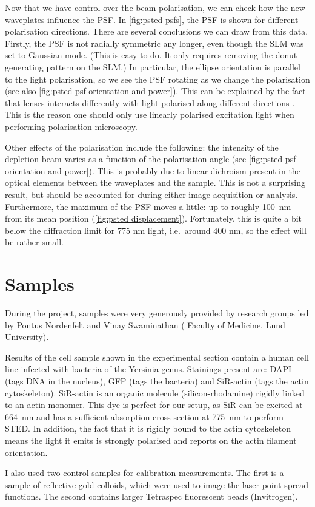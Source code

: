 Now that we have control over the beam polarisation, we can check how the new waveplates influence the PSF. In \autoref{fig:psted psfs}, the PSF is shown for different polarisation directions. There are several conclusions we can draw from this data.  Firstly, the PSF is not radially symmetric any longer, even though the SLM was set to Gaussian mode. (This is easy to do. It only requires removing the donut-generating pattern on the SLM.) In particular, the ellipse orientation is parallel to the light polarisation, so we see the PSF rotating as we change the polarisation (see also \autoref{fig:psted psf orientation and power}). This can be explained by the fact that lenses interacts differently with light polarised along different directions \cite{Egner2020}. This is the reason one should only use linearly polarised excitation light when performing polarisation microscopy.

Other effects of the polarisation include the following: the intensity of the depletion beam varies as a function of the polarisation angle (see \autoref{fig:psted psf orientation and power}). This is probably due to linear dichroism present in the optical elements between the waveplates and the sample. This is not a surprising result, but should be accounted for during either image acquisition or analysis. Furthermore, the maximum of the PSF moves a little: up to roughly 100~nm from its mean position (\autoref{fig:psted displacement}). Fortunately, this is quite a bit below the diffraction limit for 775 nm light, i.e.~around 400 nm, so the effect will be rather small.

\section{Samples}
\label{sec:samples}

During the project, samples were very generously provided by research groups led by Pontus Nordenfelt and Vinay Swaminathan (%
Faculty of Medicine, Lund University).

Results of the cell sample shown in the experimental section contain a human cell line infected with bacteria of the Yersinia genus. Stainings present are: DAPI (tags DNA in the nucleus), GFP (tags the bacteria) and SiR-actin (tags the actin cytoskeleton). SiR-actin is an organic molecule (silicon-rhodamine) rigidly linked to an actin monomer. This dye is perfect for our setup, as SiR can be excited at 664~nm and has a sufficient absorption cross-section at 775~nm to perform STED. In addition, the fact that it is rigidly bound to the actin cytoskeleton means the light it emits is strongly polarised and reports on the actin filament orientation.

I also used two control samples for calibration measurements. The first is a sample of reflective gold colloids, which were used to image the laser point spread functions. The second contains larger Tetraspec fluorescent beads (Invitrogen).